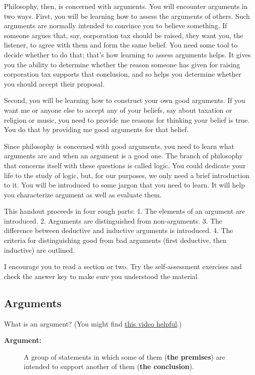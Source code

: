 \documentclass[]{article}
\begin{document}
Philosophy, then, is concerned with arguments. You will encounter
arguments in two ways. First, you will be learning how to assess the
arguments of others. Such arguments are normally intended to convince
you to believe something. If someone argues that, say, corporation tax
should be raised, they want you, the listener, to agree with them and
form the same belief. You need some tool to decide whether to do that;
that's how learning to assess arguments helps. It gives you the ability
to determine whether the reason someone has given for raising
corporation tax supports that conclusion, and so helps you determine
whether you should accept their proposal.

Second, you will be learning how to construct your own good arguments.
If you want me or anyone else to accept any of your beliefs, say about
taxation or religion or music, you need to provide me reasons for
thinking your belief is true. You do that by providing me good arguments
for that belief.

Since philosophy is concerned with good arguments, you need to learn
what arguments are and when an argument is a good one. The branch of
philosophy that concerns itself with these questions is called logic.
You could dedicate your life to the study of logic, but, for our
purposes, we only need a brief introduction to it. You will be
introduced to some jargon that you need to learn. It will help you
characterize argument as well as evaluate them.

This handout proceeds in four rough parts: 1. The elements of an
argument are introduced. 2. Arguments are distinguished from
non-arguments. 3. The difference between deductive and inductive
arguments is introduced. 4. The criteria for distinguishing good from
bad arguments (first deductive, then inductive) are outlined.

I encourage you to read a section or two. Try the self-assessment
exercises and check the answer key to make sure you understood the
material.

\subsection{Arguments}\label{arguments}

What is an argument? (You might find
\href{http://www.wi-phi.com/video/intro-critical-thinking}{this video
helpful}.)

\begin{description}
\item[\textbf{Argument:}]
A group of statements in which some of them (\textbf{the premises}) are
intended to support another of them (\textbf{the conclusion}).
\end{description}
\end{document}
